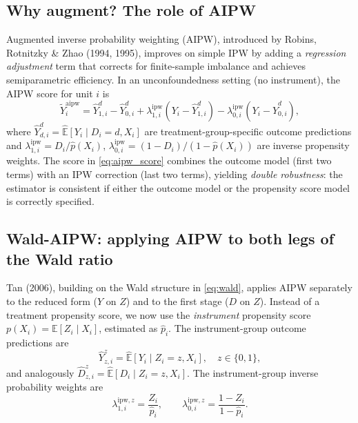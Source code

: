 \documentclass[12pt, a4paper]{article}
\theoremstyle{condstyle}
\theoremstyle{plain}
\newcommand{\phat}{\hat{p}}
\begin{document}
\subsection{Why augment? The role of AIPW}

Augmented inverse probability weighting (AIPW), introduced by
Robins, Rotnitzky \& Zhao (1994, 1995), improves on simple IPW by
adding a \emph{regression adjustment} term that corrects for
finite-sample imbalance and achieves semiparametric efficiency.
In an unconfoundedness setting (no instrument), the AIPW score for unit $i$ is
\begin{equation}
  \tilde{Y}_i^{\mathrm{aipw}}
  = \hat{Y}^d_{1,i} - \hat{Y}^d_{0,i}
    + \lambda^{\mathrm{ipw}}_{1,i}(Y_i - \hat{Y}^d_{1,i})
    - \lambda^{\mathrm{ipw}}_{0,i}(Y_i - \hat{Y}^d_{0,i}),
  \label{eq:aipw_score}
\end{equation}
where $\hat{Y}^d_{d,i}=\widehat{\mathbb{E}}[Y_i\mid D_i=d, X_i]$ are
treatment-group-specific outcome predictions and
$\lambda^{\mathrm{ipw}}_{1,i}=D_i/\hat{p}(X_i)$,
$\lambda^{\mathrm{ipw}}_{0,i}=(1-D_i)/(1-\hat{p}(X_i))$ are inverse propensity weights.
The score in \eqref{eq:aipw_score} combines the outcome model (first two terms) with
an IPW correction (last two terms), yielding \emph{double robustness}:
the estimator is consistent if either the outcome model or the propensity score model is
correctly specified.

\subsection{Wald-AIPW: applying AIPW to both legs of the Wald ratio}

Tan (2006), building on the Wald structure in \eqref{eq:wald}, applies AIPW
separately to the reduced form ($Y$ on $Z$) and to the first stage ($D$ on $Z$).
Instead of a treatment propensity score, we now use the \emph{instrument} propensity
score $p(X_i)=\mathbb{E}[Z_i\mid X_i]$, estimated as $\phat_i$.
The instrument-group outcome predictions are
\begin{equation}
  \hat{Y}^z_{z,i} = \widehat{\mathbb{E}}[Y_i\mid Z_i=z, X_i], \quad z\in\{0,1\},
  \label{eq:Yhat_z}
\end{equation}
and analogously $\hat{D}^z_{z,i}=\widehat{\mathbb{E}}[D_i\mid Z_i=z,X_i]$.
The instrument-group inverse probability weights are
\begin{equation}
  \lambda^{\mathrm{ipw},z}_{1,i} = \frac{Z_i}{\phat_i},
  \qquad
  \lambda^{\mathrm{ipw},z}_{0,i} = \frac{1-Z_i}{1-\phat_i}.
  \label{eq:ipw_z}
\end{equation}
\end{document}
